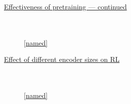 \documentclass{beamer}
\begin{document}
\begin{frame}[plain]
		\centering
		\underline{Effectiveness of pretraining --- continued}
		\vspace{-1cm}
\begin{figure}[!t]
  \captionsetup[subfloat]{position=top,labelformat=empty}
  \centering
    \subfloat[]{  \resizebox{0.4\textwidth}{!}{}}
    \subfloat[]{  \resizebox{0.4\textwidth}{!}{}}\\
  \vspace{-1cm}
    \subfloat[]{  \resizebox{0.4\textwidth}{!}{}} \\
    \ref{named}
\end{figure}
\end{frame}



\begin{frame}[plain]
		\centering
		\underline{Effect of different encoder sizes on RL}
		\vspace{-1cm}
\begin{figure}[!t]
  \captionsetup[subfloat]{position=top,labelformat=empty}
  \centering
    \subfloat[]{  \resizebox{0.4\textwidth}{!}{}}
    \subfloat[]{  \resizebox{0.4\textwidth}{!}{}}\\
  \vspace{-1cm}
    \subfloat[]{  \resizebox{0.4\textwidth}{!}{}}
    \subfloat[]{  \resizebox{0.4\textwidth}{!}{}}\\
    \ref{named}
\end{figure}
\end{frame}
\end{document}
